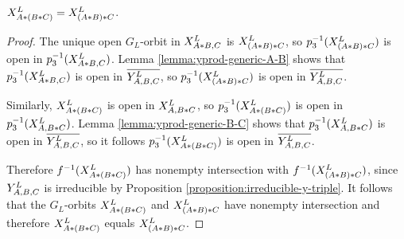 \documentclass[a4paper, 11pt]{report}
\begin{document}
\begin{proposition}\label{proposition:associativity}
$\xprod[L]{A\ast (B\ast C)} = \xprod[L]{(A\ast B)\ast C}$.
\end{proposition}

\begin{proof}
The unique open $G_L$-orbit in $\xprod[L]{A\ast B, C}$ is $\xprod[L]{(A\ast B)\ast C}$, so $p_3^{-1}(\xprod[L]{(A\ast B)\ast C})$ is open in $p_3^{-1}(\xprod[L]{A\ast B,C})$. Lemma \ref{lemma:yprod-generic-A-B} shows that $p_3^{-1}(\xprod[L]{A\ast B,C})$ is open in $\overline{\yprod[L]{A,B,C}}$, so $p_3^{-1}(\xprod[L]{(A\ast B)\ast C})$ is open in $\overline{\yprod[L]{A,B,C}}$.

Similarly, $\xprod[L]{A\ast (B\ast C)}$ is open in $\xprod[L]{A,B\ast C}$, so $p_3^{-1}(\xprod[L]{A\ast (B\ast C)})$ is open in $p_3^{-1}(\xprod[L]{A,B\ast C})$. Lemma \ref{lemma:yprod-generic-B-C} shows that $p_3^{-1}(\xprod[L]{A,B\ast C})$ is open in $\overline{\yprod[L]{A,B,C}}$, so it follows $p_3^{-1}(\xprod[L]{A\ast (B\ast C)})$ is open in $\overline{\yprod[L]{A,B,C}}$.

Therefore $f^{-1}(\xprod[L]{A\ast (B\ast C)})$ has nonempty intersection with $f^{-1}(\xprod[L]{(A\ast B)\ast C})$, since $\yprod[L]{A,B,C}$ is irreducible by Proposition \ref{proposition:irreducible-y-triple}. It follows that the $G_L$-orbits $\xprod[L]{A\ast (B\ast C)}$ and $\xprod[L]{(A\ast B)\ast C}$ have nonempty intersection and therefore $\xprod[L]{A\ast (B\ast C)}$ equals $\xprod[L]{(A\ast B)\ast C}$.
\end{proof}
\end{document}

